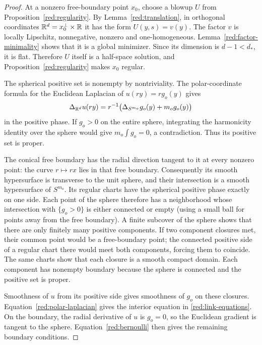\begin{proof}
At a nonzero free-boundary point $x_0$, choose a blowup $U$ from
Proposition~\ref{red:regularity}.  By Lemma~\ref{red:translation}, in
orthogonal coordinates $\mathbb R^d=x_0^\perp\times\mathbb R$ it has the form
$U(y,s)=v(y)$.  The factor $v$ is locally Lipschitz, nonnegative, nonzero
and one-homogeneous.  Lemma~\ref{red:factor-minimality} shows that it is a
global minimizer.  Since its dimension is $d-1<d_*$, it is flat.  Therefore
$U$ itself is a half-space solution, and Proposition~\ref{red:regularity}
makes $x_0$ regular.

The spherical positive set is nonempty by nontriviality.  The polar-coordinate
formula for the Euclidean Laplacian of $u(ry)=r g_o(y)$ gives
\begin{equation}\label{red:polar-laplacian}
 \Delta_{\mathbb R^d}u(ry)=r^{-1}
       \bigl(\Delta_{S^{m_o}}g_o(y)+m_o g_o(y)\bigr)
\end{equation}
in the positive phase.  If $g_o>0$ on the entire sphere, integrating the
harmonicity identity over the sphere would give $m_o\int g_o=0$, a
contradiction.  Thus its positive set is proper.

The conical free boundary has the radial direction tangent to it at every
nonzero point: the curve $r\mapsto rx$ lies in that free boundary.
Consequently its smooth hypersurface is transverse to the unit sphere,
and their intersection is a smooth hypersurface of $S^{m_o}$.  Its regular
charts have the spherical positive phase exactly on one side.  Each point of
the sphere therefore has a neighborhood whose intersection with $\{g_o>0\}$
is either connected or empty (using a small ball for points away from the
free boundary).  A finite subcover of the sphere shows that there are only
finitely many positive components.  If two component closures met, their
common point would be a free-boundary point; the connected positive side of
a regular chart there would meet both components, forcing them to coincide.
The same charts show that each closure is a smooth compact domain.  Each
component has nonempty boundary because the sphere is connected and the
positive set is proper.

Smoothness of $u$ from its positive side gives smoothness of $g_o$ on these
closures.  Equation~\eqref{red:polar-laplacian} gives the interior equation
in \eqref{red:link-equations}.  On the boundary, the radial derivative of
$u$ is $g_o=0$, so the Euclidean gradient is tangent to the sphere.
Equation~\eqref{red:bernoulli} then gives the remaining boundary conditions.
\end{proof}

